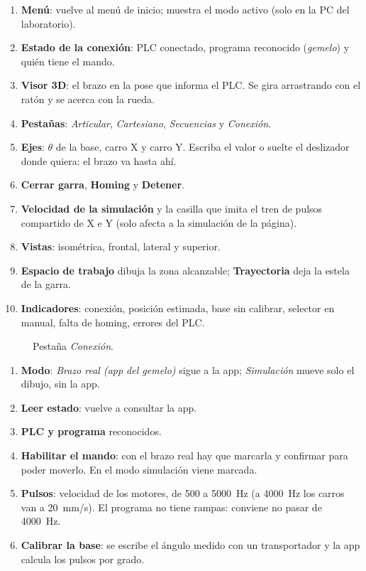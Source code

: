 \begin{enumerate}[label=\num{\arabic*}, leftmargin=9mm]
\item \textbf{Menú}: vuelve al menú de inicio; muestra el modo activo (solo en la PC del laboratorio).
\item \textbf{Estado de la conexión}: PLC conectado, programa reconocido (\emph{gemelo}) y quién tiene el mando.
\item \textbf{Visor 3D}: el brazo en la pose que informa el PLC. Se gira arrastrando con el ratón y se acerca con la rueda.
\item \textbf{Pestañas}: \emph{Articular}, \emph{Cartesiano}, \emph{Secuencias} y \emph{Conexión}.
\item \textbf{Ejes}: $\theta$ de la base, carro X y carro Y. Escriba el valor o suelte el deslizador donde quiera: el brazo va hasta ahí.
\item \textbf{Cerrar garra}, \textbf{Homing} y \textbf{Detener}.
\item \textbf{Velocidad de la simulación} y la casilla que imita el tren de pulsos compartido de X e Y (solo afecta a la simulación de la página).
\item \textbf{Vistas}: isométrica, frontal, lateral y superior.
\item \textbf{Espacio de trabajo} dibuja la zona alcanzable; \textbf{Trayectoria} deja la estela de la garra.
\item \textbf{Indicadores}: conexión, posición estimada, base sin calibrar, selector en manual, falta de homing, errores del PLC.
\end{enumerate}

\begin{figure}[H]
\centering
{}
\caption{Pestaña \emph{Conexión}.}
\end{figure}
\begin{enumerate}[label=\num{\arabic*}, leftmargin=9mm]
\item \textbf{Modo}: \emph{Brazo real (app del gemelo)} sigue a la app; \emph{Simulación} mueve solo el dibujo, sin la app.
\item \textbf{Leer estado}: vuelve a consultar la app.
\item \textbf{PLC y programa} reconocidos.
\item \textbf{Habilitar el mando}: con el brazo real hay que marcarla y confirmar para poder moverlo. En el modo simulación viene marcada.
\item \textbf{Pulsos}: velocidad de los motores, de 500 a 5000~Hz (a 4000~Hz los carros van a 20~mm/s). El programa no tiene rampas: conviene no pasar de 4000~Hz.
\item \textbf{Calibrar la base}: se escribe el ángulo medido con un transportador y la app calcula los pulsos por grado.
\end{enumerate}

